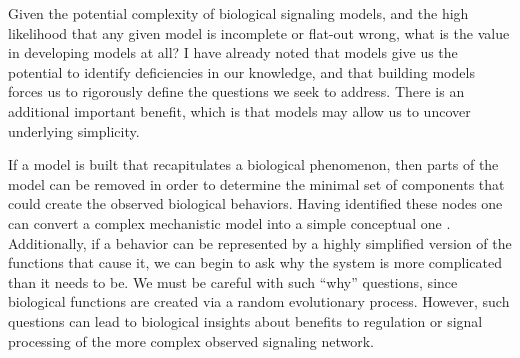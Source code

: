 Given the potential complexity of biological signaling models, and
the high likelihood that any given model is incomplete or flat-out
wrong, what is the value in developing models at all? I have already noted
that models give us the
potential to identify deficiencies in our knowledge, and
that building models forces us to rigorously define the questions
we seek to address. There is an additional important benefit, which is
that models may allow us to uncover underlying simplicity.


If a model
is built that recapitulates a biological phenomenon, then parts of
the model can be removed in order to determine the minimal set of
components that could create the observed biological behaviors. Having identified
these nodes one can convert a complex mechanistic model into a simple conceptual one
\cite{Ku2012,Dutkowski2011}. Additionally, if a behavior can be represented by
a highly simplified version of the functions that cause it, we can begin to
ask why the system is more complicated than it needs to be. We must be
careful with such ``why'' questions, since biological functions are created
via a random evolutionary process. However, such questions can
lead to biological insights about benefits to regulation or signal processing
of the more complex observed signaling network.

  

